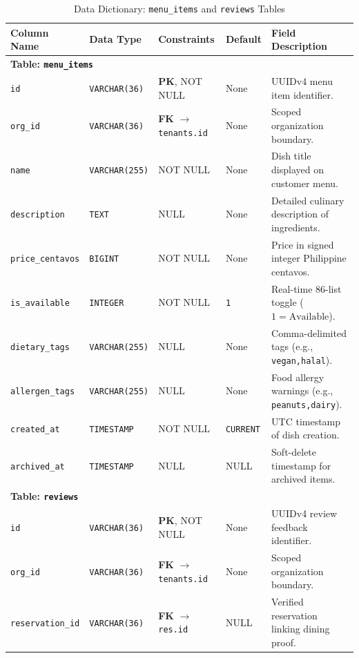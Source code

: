 \begin{table}[htbp]
\centering
\caption{Data Dictionary: \texttt{menu\_items} and \texttt{reviews} Tables}
\label{tab:dict_menu_reviews}
\small
\begin{tabularx}{\textwidth}{llp{3.2cm}lX}
\toprule
\textbf{Column Name} & \textbf{Data Type} & \textbf{Constraints} & \textbf{Default} & \textbf{Field Description} \\
\midrule
\multicolumn{5}{l}{\textbf{Table: \texttt{menu\_items}}} \\
\texttt{id} & \texttt{VARCHAR(36)} & \textbf{PK}, NOT NULL & None & UUIDv4 menu item identifier. \\
\texttt{org\_id} & \texttt{VARCHAR(36)} & \textbf{FK} $\to$ \texttt{tenants.id} & None & Scoped organization boundary. \\
\texttt{name} & \texttt{VARCHAR(255)} & NOT NULL & None & Dish title displayed on customer menu. \\
\texttt{description} & \texttt{TEXT} & NULL & None & Detailed culinary description of ingredients. \\
\texttt{price\_centavos}& \texttt{BIGINT} & NOT NULL & None & Price in signed integer Philippine centavos. \\
\texttt{is\_available}& \texttt{INTEGER} & NOT NULL & \texttt{1} & Real-time 86-list toggle ($1 = \text{Available}$). \\
\texttt{dietary\_tags}& \texttt{VARCHAR(255)} & NULL & None & Comma-delimited tags (e.g., \texttt{vegan,halal}). \\
\texttt{allergen\_tags}& \texttt{VARCHAR(255)} & NULL & None & Food allergy warnings (e.g., \texttt{peanuts,dairy}). \\
\texttt{created\_at} & \texttt{TIMESTAMP} & NOT NULL & \texttt{CURRENT} & UTC timestamp of dish creation. \\
\texttt{archived\_at}& \texttt{TIMESTAMP} & NULL & NULL & Soft-delete timestamp for archived items. \\
\midrule
\multicolumn{5}{l}{\textbf{Table: \texttt{reviews}}} \\
\texttt{id} & \texttt{VARCHAR(36)} & \textbf{PK}, NOT NULL & None & UUIDv4 review feedback identifier. \\
\texttt{org\_id} & \texttt{VARCHAR(36)} & \textbf{FK} $\to$ \texttt{tenants.id} & None & Scoped organization boundary. \\
\texttt{reservation\_id}& \texttt{VARCHAR(36)}& \textbf{FK} $\to$ \texttt{res.id} & NULL & Verified reservation linking dining proof. \\

\end{tabularx}
\end{table}
